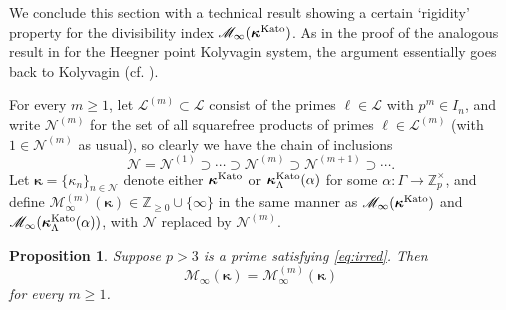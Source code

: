 \documentclass[10pt,reqno]{amsart}
\numberwithin{equation}{section}
\theoremstyle{plain}
\theoremstyle{definition}
\theoremstyle{definition}
\theoremstyle{plain}
\newtheorem{prop}[thm]{Proposition}
\theoremstyle{plain}
\theoremstyle{plain}
\theoremstyle{plain}
\theoremstyle{plain}
\theoremstyle{plain}
\newcommand{\Z}{\mathbb{Z}}
\begin{document}
We conclude this section with a technical result showing a certain `rigidity' property for the divisibility index $\mathscr{M}_\infty(\boldsymbol{\kappa}^{\rm Kato})$. As in the proof of the analogous result in \cite[Prop.~2.2.1]{BCGS} for the Heegner point Kolyvagin system, the argument essentially goes back to Kolyvagin (cf. \cite[Prop.~5.2]{mccallum}).

For every $m\geq 1$, let $\mathcal{L}^{(m)}\subset\mathcal{L}$ consist of the primes $\ell\in\mathcal{L}$ with $p^m\in I_n$, and write $\mathcal{N}^{(m)}$ for the set of all squarefree products of primes $\ell\in\mathcal{L}^{(m)}$ (with $1\in\mathcal{N}^{(m)}$ as usual), so clearly we have the chain of inclusions
\begin{equation}\label{eq:nested}
\mathcal{N}=\mathcal{N}^{(1)}\supset\cdots\supset\mathcal{N}^{(m)}\supset\mathcal{N}^{(m+1)}\supset\cdots.
\end{equation}
Let $\boldsymbol{\kappa}=\{\kappa_n\}_{n\in\mathcal{N}}$ denote either $\boldsymbol{\kappa}^{\rm Kato}$ or $\boldsymbol{\kappa}_\Lambda^{\rm Kato}(\alpha)$ for some $\alpha:\Gamma\rightarrow\Z_p^\times$, and define $\mathscr{M}_\infty^{(m)}(\boldsymbol{\kappa})\in\Z_{\geq 0}\cup\{\infty\}$ in the same manner as $\mathscr{M}_\infty(\boldsymbol{\kappa}^{\rm Kato})$ and $\mathscr{M}_\infty(\boldsymbol{\kappa}_\Lambda^{\rm Kato}(\alpha))$, with $\mathcal{N}$ replaced by $\mathcal{N}^{(m)}$. 

\begin{prop}\label{prop:mccullen}
Suppose $p>3$ is a prime satisfying \eqref{eq:irred}. Then 
\[
\mathscr{M}_\infty(\boldsymbol{\kappa})=
\mathscr{M}_\infty^{(m)}(\boldsymbol{\kappa})
\]
for every $m\geq 1$.
\end{prop}
\end{document}
